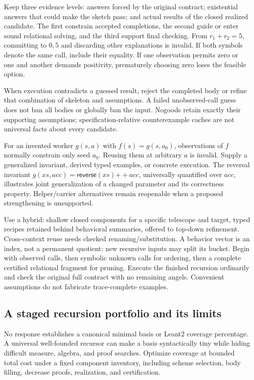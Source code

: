 Keep three evidence levels: answers forced by the original contract;
existential answers that could make the sketch pass; and actual results of
the closed realized candidate. The first constrain accepted completions, the
second guide or enter sound relational solving, and the third support final
checking. From $r_1+r_2=5$, committing to $0,5$ and discarding other explanations
is invalid. If both symbols denote the same call, include their equality.
If one observation permits zero or one and another demands positivity,
prematurely choosing zero loses the feasible option.

When execution contradicts a guessed result, reject the completed body or
refine that combination of skeleton and assumptions. A failed unobserved-call
guess does not ban all bodies or globally ban the input. Nogoods retain exactly
their supporting assumptions; specification-relative counterexample caches
are not universal facts about every candidate.

For an invented worker $g(s,a)$ with $f(s)=g(s,a_0)$, observations of $f$
normally constrain only seed $a_0$. Reusing them at arbitrary $a$ is invalid.
Supply a generalized invariant, derived typed examples, or concrete execution.
The reversal invariant
$g(xs,acc)=\mathsf{reverse}(xs)\mathbin{+\!+}acc$, universally quantified over
$acc$, illustrates joint generalization of a changed parameter and its
correctness property. Helper/carrier alternatives remain reopenable when a
proposed strengthening is unsupported.

Use a hybrid: shallow closed components for a specific telescope and target,
typed recipes retained behind behavioral summaries, offered to top-down
refinement. Cross-context reuse needs checked renaming/substitution. A behavior
vector is an index, not a permanent quotient: new recursive inputs may split
its bucket. Begin with observed calls, then symbolic unknown calls for ordering,
then a complete certified relational fragment for pruning. Execute the finished
recursion ordinarily and check the original full contract with no remaining
angels. Convenient assumptions do not fabricate trace-complete examples.

\subsection{A staged recursion portfolio and its limits}\label{sec:recursion-basis}

No response establishes a canonical minimal basis or Leant2 coverage percentage.
A universal well-founded recursor can make a basis syntactically tiny while
hiding difficult measure, algebra, and proof searches. Optimize coverage at
bounded total cost under a fixed component inventory, including scheme
selection, body filling, decrease proofs, realization, and certification.

